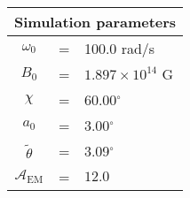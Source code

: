 \begin{tabular}{ccl}
\multicolumn{3}{c}{Simulation parameters} \\
\hline
$\omega_0$  &=& 100.0 rad/s\\
$B_0$  &=& ${1.897}\times 10^{14}$ G \\
$\chi$  &=& 60.00$^{\circ}$ \\
$a_0$ &=& 3.00$^{\circ}$ \\
$\tilde{\theta}$ &= & 3.09$^{\circ}$ \\
$\mathcal{A}_{\mathrm{EM}}$ &= & $12.0$
\end{tabular}